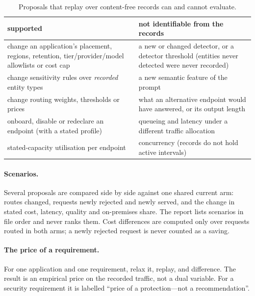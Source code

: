 \documentclass[11pt]{article}
\begin{document}
\begin{table}[t]
\centering
\small
\caption{Proposals that replay over content-free records can and cannot evaluate.}
\label{tab:supported}
\begin{tabular}{@{}p{7.2cm}p{7.4cm}@{}}
\toprule
supported & not identifiable from the records \\
\midrule
change an application's placement, regions, retention, tier/provider/model allowlists or cost
cap & a new or changed detector, or a detector threshold (entities never detected were never
recorded) \\
change sensitivity rules over \emph{recorded} entity types & a new semantic feature of the
prompt \\
change routing weights, thresholds or prices & what an alternative endpoint would have answered,
or its output length \\
onboard, disable or redeclare an endpoint (with a stated profile) & queueing and latency under
a different traffic allocation \\
stated-capacity utilisation per endpoint & concurrency (records do not hold active intervals) \\
\bottomrule
\end{tabular}
\end{table}

\paragraph{Scenarios.} Several proposals are compared side by side against one shared current
arm: routes changed, requests newly rejected and newly served, and the change in stated cost,
latency, quality and on-premises share. The report lists scenarios in file order and never
ranks them. Cost differences are computed only over requests routed in both arms; a newly
rejected request is never counted as a saving.

\paragraph{The price of a requirement.} For one application and one requirement, relax it,
replay, and difference. The result is an empirical price on the recorded traffic, not a dual
variable. For a security requirement it is labelled ``price of a protection---not a
recommendation''.
\end{document}
